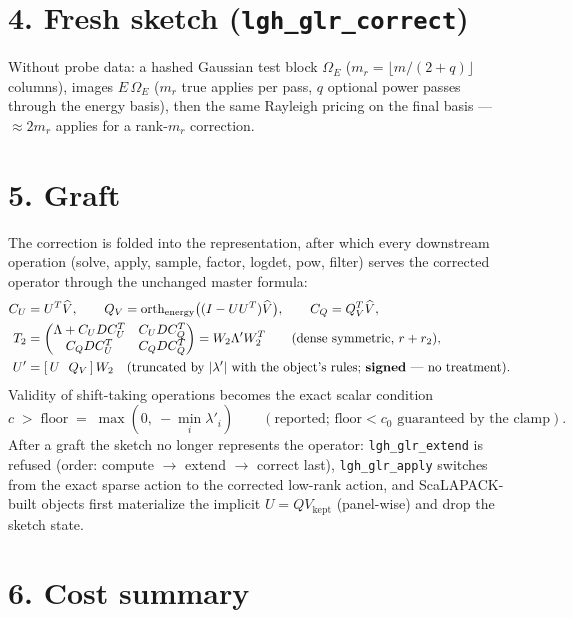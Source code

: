 \documentclass[11pt]{article}
\begin{document}
\section*{4. Fresh sketch (\texttt{lgh\_glr\_correct})}

Without probe data: a hashed Gaussian test block $\Omega_E$
($m_r = \lfloor m / (2 + q) \rfloor$ columns), images $E\,\Omega_E$
($m_r$ true applies per pass, $q$ optional power passes through the energy
basis), then the same Rayleigh pricing on the final basis --- $\approx 2m_r$
applies for a rank-$m_r$ correction.

\section*{5. Graft}

The correction is folded into the representation, after which every
downstream operation (solve, apply, sample, factor, logdet, pow, filter)
serves the corrected operator through the unchanged master formula:
\begin{align}
C_U &= U^T \widehat{V}, \qquad
Q_V = \mathrm{orth}_{\mathrm{energy}}\bigl((I - U U^T)\widehat{V}\bigr), \qquad
C_Q = Q_V^T \widehat{V},\\
T_2 &= \begin{pmatrix} \Lambda + C_U D C_U^T & C_U D C_Q^T\\
                       C_Q D C_U^T & C_Q D C_Q^T \end{pmatrix}
     = W_2 \Lambda' W_2^T \qquad (\text{dense symmetric, } r + r_2),\\
U' &= [\,U \ \ Q_V\,]\, W_2 \quad (\text{truncated by } |\lambda'| \text{ with
the object's rules; \textbf{signed} --- no treatment}).
\end{align}
Validity of shift-taking operations becomes the exact scalar condition
\begin{equation}
c \;>\; \mathrm{floor} \;=\; \max(0,\ -\min_i \lambda'_i)
\qquad (\text{reported; } \mathrm{floor} < c_0 \text{ guaranteed by the
clamp}).
\end{equation}
After a graft the sketch no longer represents the operator:
\texttt{lgh\_glr\_extend} is refused (order: compute $\to$ extend $\to$
correct last), \texttt{lgh\_glr\_apply} switches from the exact sparse
action to the corrected low-rank action, and ScaLAPACK-built objects first
materialize the implicit $U = Q V_{\mathrm{kept}}$ (panel-wise) and drop the
sketch state.

\section*{6. Cost summary}
\end{document}
